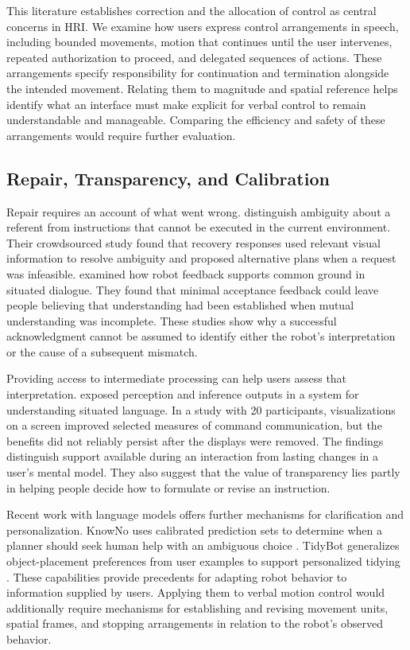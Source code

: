 This literature establishes correction and the allocation of control as central concerns in HRI. We examine how users express control arrangements in speech, including bounded movements, motion that continues until the user intervenes, repeated authorization to proceed, and delegated sequences of actions. These arrangements specify responsibility for continuation and termination alongside the intended movement. Relating them to magnitude and spatial reference helps identify what an interface must make explicit for verbal control to remain understandable and manageable. Comparing the efficiency and safety of these arrangements would require further evaluation.

\subsection{Repair, Transparency, and Calibration}

Repair requires an account of what went wrong. \citet{marge2015recovery} distinguish ambiguity about a referent from instructions that cannot be executed in the current environment. Their crowdsourced study found that recovery responses used relevant visual information to resolve ambiguity and proposed alternative plans when a request was infeasible. \citet{chai2014ground} examined how robot feedback supports common ground in situated dialogue. They found that minimal acceptance feedback could leave people believing that understanding had been established when mutual understanding was incomplete. These studies show why a successful acknowledgment cannot be assumed to identify either the robot's interpretation or the cause of a subsequent mismatch.

Providing access to intermediate processing can help users assess that interpretation. \citet{perlmutter2016transparency} exposed perception and inference outputs in a system for understanding situated language. In a study with 20 participants, visualizations on a screen improved selected measures of command communication, but the benefits did not reliably persist after the displays were removed. The findings distinguish support available during an interaction from lasting changes in a user's mental model. They also suggest that the value of transparency lies partly in helping people decide how to formulate or revise an instruction.

Recent work with language models offers further mechanisms for clarification and personalization. KnowNo uses calibrated prediction sets to determine when a planner should seek human help with an ambiguous choice \citep{ren2023knowno}. TidyBot generalizes object-placement preferences from user examples to support personalized tidying \citep{wu2023tidybot}. These capabilities provide precedents for adapting robot behavior to information supplied by users. Applying them to verbal motion control would additionally require mechanisms for establishing and revising movement units, spatial frames, and stopping arrangements in relation to the robot's observed behavior.

